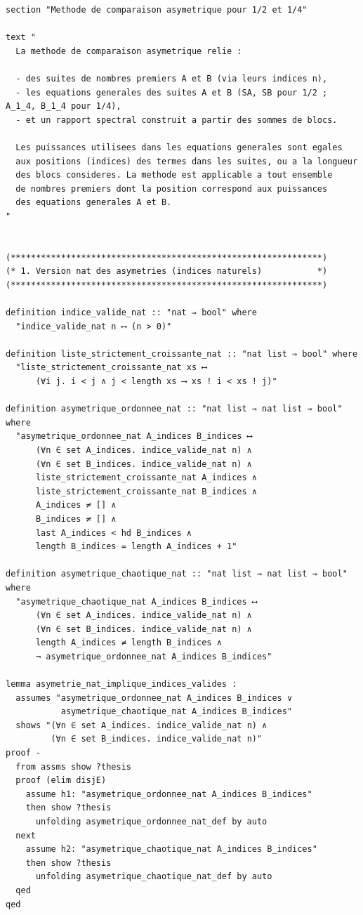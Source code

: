 \documentclass[a4paper,11pt]{article}
\begin{document}
\begin{holcode}[title={\textcolor{white}{Fichier : methode\_spectral.thy -- Partie 3/4}}]
\begin{lstlisting}
section "Methode de comparaison asymetrique pour 1/2 et 1/4"

text "
  La methode de comparaison asymetrique relie :

  - des suites de nombres premiers A et B (via leurs indices n),
  - les equations generales des suites A et B (SA, SB pour 1/2 ; A_1_4, B_1_4 pour 1/4),
  - et un rapport spectral construit a partir des sommes de blocs.

  Les puissances utilisees dans les equations generales sont egales
  aux positions (indices) des termes dans les suites, ou a la longueur
  des blocs consideres. La methode est applicable a tout ensemble
  de nombres premiers dont la position correspond aux puissances
  des equations generales A et B.
"


(**************************************************************)
(* 1. Version nat des asymetries (indices naturels)           *)
(**************************************************************)

definition indice_valide_nat :: "nat ⇒ bool" where
  "indice_valide_nat n ⟷ (n > 0)"

definition liste_strictement_croissante_nat :: "nat list ⇒ bool" where
  "liste_strictement_croissante_nat xs ⟷
      (∀i j. i < j ∧ j < length xs ⟶ xs ! i < xs ! j)"

definition asymetrique_ordonnee_nat :: "nat list ⇒ nat list ⇒ bool" where
  "asymetrique_ordonnee_nat A_indices B_indices ⟷
      (∀n ∈ set A_indices. indice_valide_nat n) ∧
      (∀n ∈ set B_indices. indice_valide_nat n) ∧
      liste_strictement_croissante_nat A_indices ∧
      liste_strictement_croissante_nat B_indices ∧
      A_indices ≠ [] ∧
      B_indices ≠ [] ∧
      last A_indices < hd B_indices ∧
      length B_indices = length A_indices + 1"

definition asymetrique_chaotique_nat :: "nat list ⇒ nat list ⇒ bool" where
  "asymetrique_chaotique_nat A_indices B_indices ⟷
      (∀n ∈ set A_indices. indice_valide_nat n) ∧
      (∀n ∈ set B_indices. indice_valide_nat n) ∧
      length A_indices ≠ length B_indices ∧
      ¬ asymetrique_ordonnee_nat A_indices B_indices"

lemma asymetrie_nat_implique_indices_valides :
  assumes "asymetrique_ordonnee_nat A_indices B_indices ∨
           asymetrique_chaotique_nat A_indices B_indices"
  shows "(∀n ∈ set A_indices. indice_valide_nat n) ∧
         (∀n ∈ set B_indices. indice_valide_nat n)"
proof -
  from assms show ?thesis
  proof (elim disjE)
    assume h1: "asymetrique_ordonnee_nat A_indices B_indices"
    then show ?thesis
      unfolding asymetrique_ordonnee_nat_def by auto
  next
    assume h2: "asymetrique_chaotique_nat A_indices B_indices"
    then show ?thesis
      unfolding asymetrique_chaotique_nat_def by auto
  qed
qed
\end{lstlisting}
\end{holcode}
\end{document}
